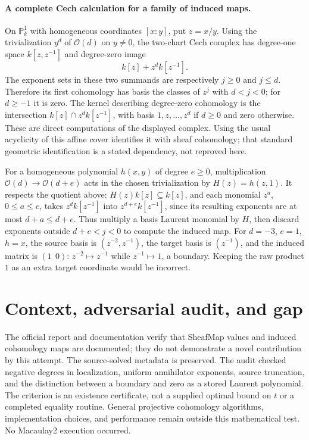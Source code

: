 \documentclass[11pt]{article}
\begin{document}
\paragraph{A complete Cech calculation for a family of induced maps.}
On $\mathbb P^1_k$ with homogeneous coordinates $[x:y]$, put $z=x/y$.
Using the trivialization $y^d$ of $\mathcal O(d)$ on $y\ne0$, the two-chart
Cech complex has degree-one space $k[z,z^{-1}]$ and degree-zero image
\[
k[z]+z^d k[z^{-1}].
\]
The exponent sets in these two summands are respectively $j\ge0$ and
$j\le d$. Therefore its first cohomology has basis the classes of $z^j$
with $d<j<0$; for $d\ge-1$ it is zero. The kernel describing degree-zero
cohomology is the intersection $k[z]\cap z^d k[z^{-1}]$, with basis
$1,z,\ldots,z^d$ if $d\ge0$ and zero otherwise.
These are direct computations of the displayed complex. Using the usual
acyclicity of this affine cover identifies it with sheaf cohomology; that
standard geometric identification is a stated dependency, not reproved here.

For a homogeneous polynomial $h(x,y)$ of degree $e\ge0$, multiplication
$\mathcal O(d)\to\mathcal O(d+e)$ acts in the chosen trivialization by
$H(z)=h(z,1)$. It respects the quotient above: $H(z)k[z]\subseteq k[z]$,
and each monomial $z^a$, $0\le a\le e$, takes
$z^d k[z^{-1}]$ into $z^{d+e}k[z^{-1}]$, since its resulting exponents
are at most $d+a\le d+e$. Thus multiply a basis Laurent monomial by
$H$, then discard exponents outside $d+e<j<0$ to compute the induced map.
For $d=-3$, $e=1$, $h=x$, the source basis is $(z^{-2},z^{-1})$, the
target basis is $(z^{-1})$, and the induced matrix is $(1\ \ 0)$:
$z^{-2}\mapsto z^{-1}$ while $z^{-1}\mapsto1$, a boundary.
Keeping the raw product $1$ as an extra target coordinate would be incorrect.

\section{Context, adversarial audit, and gap}
The official report and documentation verify that SheafMap values and induced
cohomology maps are documented; they do not demonstrate a novel contribution
by this attempt. The source-solved metadata is preserved. The audit checked
negative degrees in localization, uniform annihilator exponents, source
truncation, and the distinction between a boundary and zero as a stored
Laurent polynomial. The criterion is an existence certificate, not a supplied
optimal bound on $t$ or a completed equality routine. General projective
cohomology algorithms, implementation choices, and performance remain outside
this mathematical test. No Macaulay2 execution occurred.
\end{document}
